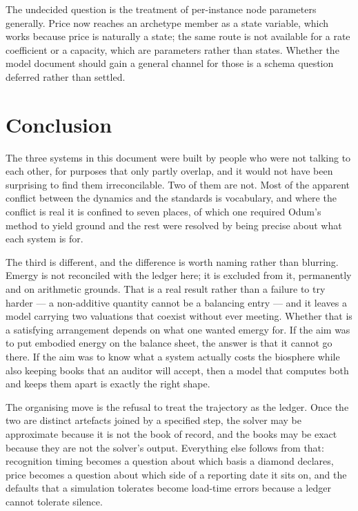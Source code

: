 \documentclass[11pt,a4paper]{article}
\begin{document}
The undecided question is the treatment of per-instance node parameters generally. Price now reaches an archetype member as a state variable, which works because price is naturally a state; the same route is not available for a rate coefficient or a capacity, which are parameters rather than states. Whether the model document should gain a general channel for those is a schema question deferred rather than settled.

\section{Conclusion}

The three systems in this document were built by people who were not talking to each other, for purposes that only partly overlap, and it would not have been surprising to find them irreconcilable. Two of them are not. Most of the apparent conflict between the dynamics and the standards is vocabulary, and where the conflict is real it is confined to seven places, of which one required Odum's method to yield ground and the rest were resolved by being precise about what each system is for.

The third is different, and the difference is worth naming rather than blurring. Emergy is not reconciled with the ledger here; it is excluded from it, permanently and on arithmetic grounds. That is a real result rather than a failure to try harder --- a non-additive quantity cannot be a balancing entry --- and it leaves a model carrying two valuations that coexist without ever meeting. Whether that is a satisfying arrangement depends on what one wanted emergy for. If the aim was to put embodied energy on the balance sheet, the answer is that it cannot go there. If the aim was to know what a system actually costs the biosphere while also keeping books that an auditor will accept, then a model that computes both and keeps them apart is exactly the right shape.

The organising move is the refusal to treat the trajectory as the ledger. Once the two are distinct artefacts joined by a specified step, the solver may be approximate because it is not the book of record, and the books may be exact because they are not the solver's output. Everything else follows from that: recognition timing becomes a question about which basis a diamond declares, price becomes a question about which side of a reporting date it sits on, and the defaults that a simulation tolerates become load-time errors because a ledger cannot tolerate silence.
\end{document}
